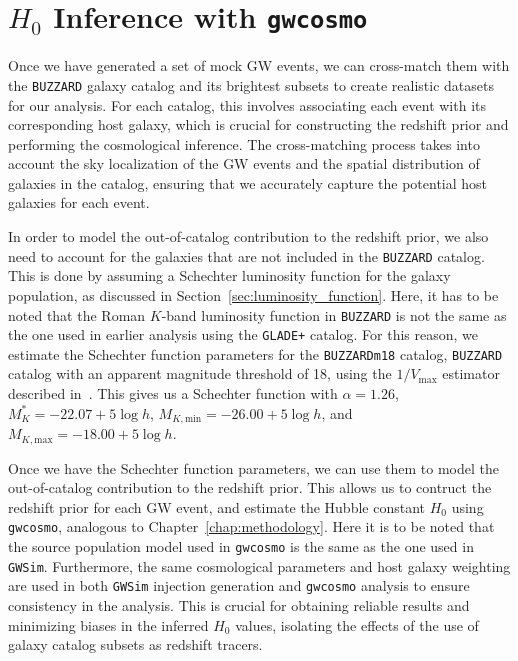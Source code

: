 \section{$H_0$ Inference with \texttt{gwcosmo}}
Once we have generated a set of mock \ac{GW} events, we can cross-match them with the \texttt{BUZZARD} galaxy catalog and its brightest subsets to create realistic datasets for our analysis. For each catalog, this involves associating each event with its corresponding host galaxy, which is crucial for constructing the redshift prior and performing the cosmological inference. The cross-matching process takes into account the sky localization of the \ac{GW} events and the spatial distribution of galaxies in the catalog, ensuring that we accurately capture the potential host galaxies for each event.

In order to model the out-of-catalog contribution to the redshift prior, we also need to account for the galaxies that are not included in the \texttt{BUZZARD} catalog. This is done by assuming a Schechter luminosity function for the galaxy population, as discussed in Section~\ref{sec:luminosity_function}. Here, it has to be noted that the Roman $K$-band luminosity function in \texttt{BUZZARD} is not the same as the one used in earlier analysis using the \texttt{GLADE+} catalog. For this reason, we estimate the Schechter function parameters for the \texttt{BUZZARDm18} catalog, \texttt{BUZZARD} catalog with an apparent magnitude threshold of 18, using the $1/V_{\mathrm{max}}$ estimator described in~\citet{schmidt1968space,takeuchi2000tests}. This gives us a Schechter function with $\alpha=1.26$, $M^*_{K} = -22.07 +5\log h$, $M_{K, \mathrm{min}} = -26.00 +5\log h$, and $M_{K, \mathrm{max}} = -18.00 +5\log h$.

Once we have the Schechter function parameters, we can use them to model the out-of-catalog contribution to the redshift prior. This allows us to contruct the redshift prior for each \ac{GW} event, and estimate the Hubble constant $H_0$ using \texttt{gwcosmo}, analogous to Chapter~\ref{chap:methodology}. Here it is to be noted that the source population model used in \texttt{gwcosmo} is the same as the one used in \texttt{GWSim}. Furthermore, the same cosmological parameters and host galaxy weighting are used in both \texttt{GWSim} injection generation and \texttt{gwcosmo} analysis to ensure consistency in the analysis. This is crucial for obtaining reliable results and minimizing biases in the inferred $H_0$ values, isolating the effects of the use of galaxy catalog subsets as redshift tracers.

